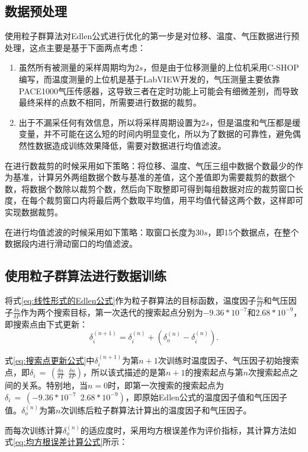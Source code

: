 \subsection{数据预处理}
使用粒子群算法对Edlen公式进行优化的第一步是对位移、温度、气压数据进行预处理，这点主要是基于下面两点考虑：
\begin{enumerate}
  \item 虽然所有被测量的采样周期均为$2s$，但是由于位移测量的上位机采用C-SHOP编写，而温度测量的上位机是基于LabVIEW开发的，气压测量主要依靠PACE1000气压传感器，这导致三者在定时功能上可能会有细微差别，而导致最终采样的点数不相同，所需要进行数据的裁剪。
  \item 出于不漏采任何有效信息，所以将采样周期设置为$2s$，但是温度和气压都是缓变量，并不可能在这么短的时间内明显变化，所以为了数据的可靠性，避免偶然性数据造成训练效果降低，需要对数据进行均值滤波。
\end{enumerate}
在进行数裁剪的时候采用如下策略：将位移、温度、气压三组中数据个数最少的作为基准，计算另外两组数据个数与基准的差值，这个差值即为需要裁剪的数据个数，将数据个数除以裁剪个数，然后向下取整即可得到每组数据对应的裁剪窗口长度，在每个裁剪窗口内将最后两个数取平均值，用平均值代替这两个数，这样即可实现数据裁剪。

在进行均值滤波的时候采用如下策略：取窗口长度为$30s$，即15个数据点，在整个数据段内进行滑动窗口的均值滤波。

\subsection{使用粒子群算法进行数据训练}
将式\eqref{eq:线性形式的Edlen公式}作为粒子群算法的目标函数，温度因子$\frac{\delta n}{\delta T}$和气压因子$\frac{\delta n}{\delta P}$作为两个搜索目标，第一次迭代的搜索起点分别为$-9.36*10^{-7}$和$2.68*10^{-9}$，即搜索点由下式更新：
\begin{equation}\label{eq:搜索点更新公式}
  \delta^{(n+1)}_i = \delta^{(n)}_i+(\delta^{(n)}_o-\delta^{(n)}_i).
  \end{equation}

式\eqref{eq:搜索点更新公式}中$\delta^{(n+1)}_i$为第$n+1$次训练时温度因子、气压因子初始搜索点，即$\delta_i\,=\,(\frac{\delta n}{\delta T}\,\,\,\frac{\delta n}{\delta P})$，所以该式描述的是第$n+1$的搜索起点与第$n$次搜索起点之间的关系。特别地，当$n=0$时，即第一次搜索的搜索起点为$\delta_i\,=\,(-9.36*10^{-7}\,\,\,2.68*10^{-9})$，即原始Edlen公式的温度因子值和气压因子值。$\delta_o^{(n)}$为第$n$次训练后粒子群算法计算出的温度因子和气压因子。

而每次训练计算$\delta_o^{(n)}$的适应度时，采用均方根误差作为评价指标，其计算方法如式\eqref{eq:均方根误差计算公式}所示：

